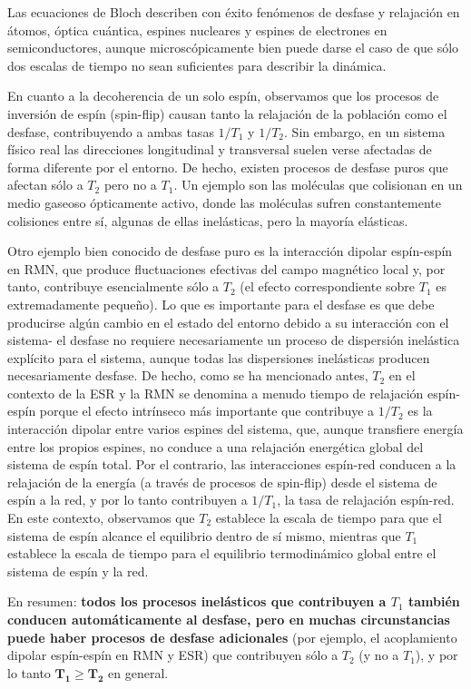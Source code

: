 \documentclass[a4paper,11pt]{book} %
\numberwithin{equation}{chapter}
\begin{document}
Las ecuaciones de Bloch describen con éxito fenómenos de desfase y relajación en átomos, óptica cuántica, espines nucleares y espines de electrones en semiconductores, aunque microscópicamente bien puede darse el caso de que sólo dos escalas de tiempo no sean suficientes para describir la dinámica. 

En cuanto a la decoherencia de un solo espín, observamos que los procesos de inversión de espín (spin-flip) causan tanto la relajación de la población como el desfase, contribuyendo a ambas tasas $1/T_1$ y $1/T_2$. Sin embargo, en un sistema físico real las direcciones longitudinal y transversal suelen verse afectadas de forma diferente por el entorno. De hecho, existen procesos de desfase puros que afectan sólo a $T_2$ pero no a $T_1$. Un ejemplo son las moléculas que colisionan en un medio gaseoso ópticamente activo, donde las moléculas sufren constantemente colisiones entre sí, algunas de ellas inelásticas, pero la mayoría elásticas.

Otro ejemplo bien conocido de desfase puro es la interacción dipolar espín-espín en RMN, que produce fluctuaciones efectivas del campo magnético local y, por tanto, contribuye esencialmente sólo a $T_2$ (el efecto correspondiente sobre $T_1$ es extremadamente pequeño). Lo que es importante para el desfase es que debe producirse algún cambio en el estado del entorno debido a su interacción con el sistema- el desfase no requiere necesariamente un proceso de dispersión inelástica explícito para el sistema, aunque todas las dispersiones inelásticas producen necesariamente desfase. De hecho, como se ha mencionado antes, $T_2$ en el contexto de la ESR y la RMN se denomina a menudo tiempo de relajación espín-espín porque el efecto intrínseco más importante que contribuye a $1/T_2$ es la interacción dipolar entre varios espines del sistema, que, aunque transfiere energía entre los propios espines, no conduce a una relajación energética global del sistema de espín total. Por el contrario, las interacciones espín-red conducen a la relajación de la energía (a través de procesos de spin-flip) desde el sistema de espín a la red, y por lo tanto contribuyen a $1/T_1$, la tasa de relajación espín-red. En este contexto, observamos que $T_2$ establece la escala de tiempo para que el sistema de espín alcance el equilibrio dentro de sí mismo, mientras que $T_1$ establece la escala de tiempo para el equilibrio termodinámico global entre el sistema de espín y la red. 

En resumen: \textbf{todos los procesos inelásticos que contribuyen a $T_1$ también conducen automáticamente al desfase, pero en muchas circunstancias puede haber procesos de desfase adicionales} (por ejemplo, el acoplamiento dipolar espín-espín en RMN y ESR) que contribuyen sólo a $T_2$ (y no a $T_1$), y por lo tanto $\bm{T_1 \geq T_2}$ en general.
\end{document}
